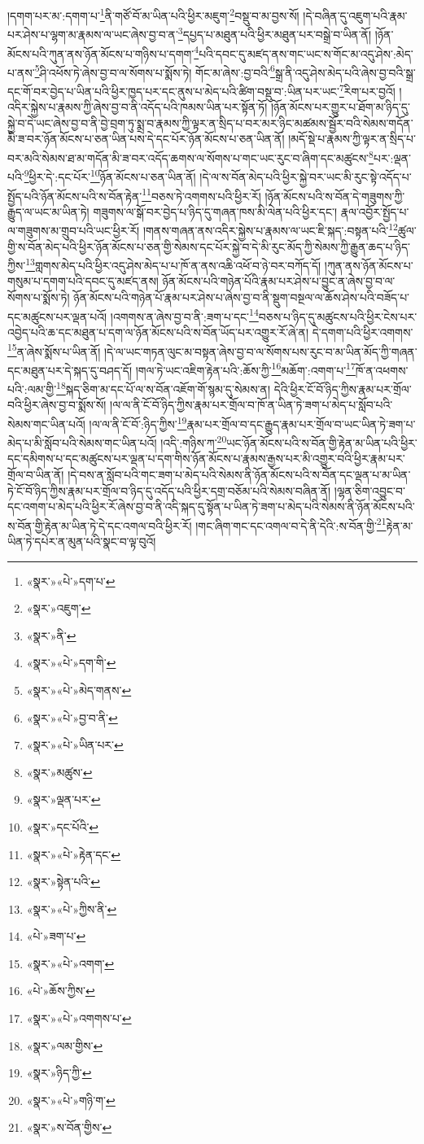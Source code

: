།དགག་པར་མ་:དགག་པ་\footnote{«སྣར་»«པེ་»དག་པ་}ནི་གཙོ་བོ་མ་ཡིན་པའི་ཕྱིར་མཇུག་\footnote{«སྣར་»འཇུག་}བསྡུ་བ་མ་བྱས་སོ། །དེ་བཞིན་དུ་འཇུག་པའི་རྣམ་པར་ཤེས་པ་ལྷག་མ་རྣམས་ལ་ཡང་ཞེས་བྱ་བ་ན་\footnote{«སྣར་»ནི་}དཔྱད་པ་མཐུན་པའི་ཕྱིར་མཐུན་པར་བསྒྲེ་བ་ཡིན་ནོ། །ཉོན་མོངས་པའི་ཀུན་ནས་ཉོན་མོངས་པ་གཉིས་པ་དགག་\footnote{«སྣར་»«པེ་»དག་གི་}པའི་དབང་དུ་མཛད་ནས་གང་ཡང་ས་གོང་མ་འདུ་ཤེས་:མེད་པ་ནས་\footnote{«སྣར་»«པེ་»མེད་གནས་}ཤི་འཕོས་ཏེ་ཞེས་བྱ་བ་ལ་སོགས་པ་སྨོས་ཏེ། གོང་མ་ཞེས་:བྱ་བའི་\footnote{«སྣར་»«པེ་»བྱ་བ་ནི་}སྒྲ་ནི་འདུ་ཤེས་མེད་པའི་ཞེས་བྱ་བའི་སྒྲ་དང་གོ་བར་བྱེད་པ་ཡིན་པའི་ཕྱིར་ཁྱད་པར་དང་ནུས་པ་མེད་པའི་ཚིག་བསྡུ་བ་:ཡིན་པར་ཡང་\footnote{«སྣར་»«པེ་»ཡིན་པར་}རིག་པར་བྱའོ། །
འདིར་སྐྱེས་པ་རྣམས་ཀྱི་ཞེས་བྱ་བ་ནི་འདོད་པའི་ཁམས་ཡིན་པར་སྟོན་ཏོ། །ཉོན་མོངས་པར་གྱུར་པ་ཐོག་མ་ཉིད་དུ་སྐྱེ་བ་དེ་ཡང་ཞེས་བྱ་བ་ནི་བྱེ་བྲག་ཏུ་སྨྲ་བ་རྣམས་ཀྱི་ལྟར་ན་སྲིད་པ་བར་མར་ཉིང་མཚམས་སྦྱོར་བའི་སེམས་གདོན་མི་ཟ་བར་ཉོན་མོངས་པ་ཅན་ཡིན་པས་དེ་དང་པོར་ཉོན་མོངས་པ་ཅན་ཡིན་ནོ། །མདོ་སྡེ་པ་རྣམས་ཀྱི་ལྟར་ན་སྲིད་པ་བར་མའི་སེམས་ཐ་མ་གདོན་མི་ཟ་བར་འདོད་ཆགས་ལ་སོགས་པ་གང་ཡང་རུང་བ་ཞིག་དང་མཚུངས་\footnote{«སྣར་»མཚུས་}པར་:ལྡན་པའི་\footnote{«སྣར་»ལྡན་པར་}ཕྱིར་དེ་:དང་པོར་\footnote{«སྣར་»དང་པོའི་}ཉོན་མོངས་པ་ཅན་ཡིན་ནོ། །དེ་ལ་ས་བོན་མེད་པའི་ཕྱིར་སྐྱེ་བར་ཡང་མི་རུང་སྟེ་འདོད་པ་སྤྱོད་པའི་ཉོན་མོངས་པའི་ས་བོན་རྟེན་\footnote{«སྣར་»«པེ་»རྟེན་དང་}བཅས་ཏེ་འགགས་པའི་ཕྱིར་རོ། །ཉོན་མོངས་པའི་ས་བོན་དེ་གཟུགས་ཀྱི་རྒྱུད་ལ་ཡང་མ་ཡིན་ཏེ། གཟུགས་ལ་སྒོ་བར་བྱེད་པ་ཉིད་དུ་གཞན་ཁས་མི་ལེན་པའི་ཕྱིར་དང་། རྣལ་འབྱོར་སྤྱོད་པ་ལ་གཟུགས་མ་གྲུབ་པའི་ཡང་ཕྱིར་རོ། །གནས་གཞན་ནས་འདིར་སྐྱེས་པ་རྣམས་ལ་ཡང་ཇི་སྐད་:བསྟན་པའི་\footnote{«སྣར་»སྟེན་པའི་}ཚུལ་གྱི་ས་བོན་མེད་པའི་ཕྱིར་ཉོན་མོངས་པ་ཅན་གྱི་སེམས་དང་པོར་སྐྱེ་བ་དེ་མི་རུང་མོད་ཀྱི་སེམས་ཀྱི་རྒྱུན་ཆད་པ་ཉིད་ཀྱིས་\footnote{«སྣར་»«པེ་»ཀྱིས་ནི་}གླགས་མེད་པའི་ཕྱིར་འདུ་ཤེས་མེད་པ་པ་ཁོ་ན་ནས་འཆི་འཕོ་བ་ཉེ་བར་བཀོད་དོ། །ཀུན་ནས་ཉོན་མོངས་པ་གསུམ་པ་དགག་པའི་དབང་དུ་མཛད་ནས། ཉོན་མོངས་པའི་གཉེན་པོའི་རྣམ་པར་ཤེས་པ་བྱུང་ན་ཞེས་བྱ་བ་ལ་སོགས་པ་སྨོས་ཏེ། ཉོན་མོངས་པའི་གཉེན་པོ་རྣམ་པར་ཤེས་པ་ཞེས་བྱ་བ་ནི་སྡུག་བསྔལ་ལ་ཆོས་ཤེས་པའི་བཟོད་པ་དང་མཚུངས་པར་ལྡན་པའོ། །འགགས་ན་ཞེས་བྱ་བ་ནི་:ཟག་པ་དང་\footnote{«པེ་»ཟག་པ་}བཅས་པ་ཉིད་དུ་མཚུངས་པའི་ཕྱིར་ངེས་པར་འབྱེད་པའི་ཆ་དང་མཐུན་པ་དག་ལ་ཉོན་མོངས་པའི་ས་བོན་ཡོད་པར་འགྱུར་རོ་ཞེ་ན། དེ་དགག་པའི་ཕྱིར་འགགས་\footnote{«སྣར་»«པེ་»འགག་}ན་ཞེས་སྨོས་པ་ཡིན་ནོ། །དེ་ལ་ཡང་གཏན་ལུང་མ་བསྟན་ཞེས་བྱ་བ་ལ་སོགས་པས་རུང་བ་མ་ཡིན་མོད་ཀྱི་གཞན་དང་མཐུན་པར་དེ་སྐད་དུ་བཤད་དོ། །གལ་ཏེ་ཡང་འཇིག་རྟེན་པའི་:ཆོས་ཀྱི་\footnote{«པེ་»ཆོས་ཀྱིས་}མཆོག་:འགག་པ་\footnote{«སྣར་»«པེ་»འགགས་པ་}ཁོ་ན་འཕགས་པའི་:ལམ་གྱི་\footnote{«སྣར་»ལམ་གྱིས་}སྐད་ཅིག་མ་དང་པོ་ལ་ས་བོན་འཇོག་གོ་སྙམ་དུ་སེམས་ན། དེའི་ཕྱིར་ངོ་བོ་ཉིད་ཀྱིས་རྣམ་པར་གྲོལ་བའི་ཕྱིར་ཞེས་བྱ་བ་སྨོས་སོ། །ལ་ལ་ནི་ངོ་བོ་ཉིད་ཀྱིས་རྣམ་པར་གྲོལ་བ་ཁོ་ན་ཡིན་ཏེ་ཟག་པ་མེད་པ་སློབ་པའི་སེམས་གང་ཡིན་པའོ། །ལ་ལ་ནི་ངོ་བོ་:ཉིད་ཀྱིས་\footnote{«སྣར་»ཉིད་ཀྱི་}རྣམ་པར་གྲོལ་བ་དང་རྒྱུད་རྣམ་པར་གྲོལ་བ་ཡང་ཡིན་ཏེ་ཟག་པ་མེད་པ་མི་སློབ་པའི་སེམས་གང་ཡིན་པའོ། །འདི་:གཉིས་ཀ་\footnote{«སྣར་»«པེ་»གཉི་ག་}ཡང་ཉོན་མོངས་པའི་ས་བོན་གྱི་རྟེན་མ་ཡིན་པའི་ཕྱིར་དང་དམིགས་པ་དང་མཚུངས་པར་ལྡན་པ་དག་གིས་ཉོན་མོངས་པ་རྣམས་རྒྱས་པར་མི་འགྱུར་བའི་ཕྱིར་རྣམ་པར་གྲོལ་བ་ཡིན་ནོ། །དེ་བས་ན་སློབ་པའི་གང་ཟག་པ་མེད་པའི་སེམས་ནི་ཉོན་མོངས་པའི་ས་བོན་དང་ལྡན་པ་མ་ཡིན་ཏེ་ངོ་བོ་ཉིད་ཀྱིས་རྣམ་པར་གྲོལ་བ་ཉིད་དུ་འདོད་པའི་ཕྱིར་དགྲ་བཅོམ་པའི་སེམས་བཞིན་ནོ། །ལྷན་ཅིག་འབྱུང་བ་དང་འགག་པ་མེད་པའི་ཕྱིར་རོ་ཞེས་བྱ་བ་ནི་འདི་སྐད་དུ་སྟོན་པ་ཡིན་ཏེ་ཟག་པ་མེད་པའི་སེམས་ནི་ཉོན་མོངས་པའི་ས་བོན་གྱི་རྟེན་མ་ཡིན་ཏེ་དེ་དང་འགལ་བའི་ཕྱིར་རོ། །གང་ཞིག་གང་དང་འགལ་བ་དེ་ནི་དེའི་:ས་བོན་གྱི་\footnote{«སྣར་»ས་བོན་གྱིས་}རྟེན་མ་ཡིན་ཏེ་དཔེར་ན་མུན་པའི་སྣང་བ་ལྟ་བུའོ། 